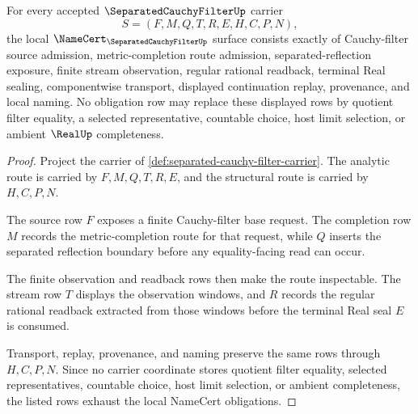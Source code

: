 \begin{theorem}
\label{thm:separated-cauchy-filter-namecert-obligations}
For every accepted $\SeparatedCauchyFilterUp$ carrier
$$
S=(F,M,Q,T,R,E,H,C,P,N),
$$
the local $\NameCert_{\SeparatedCauchyFilterUp}$ surface consists exactly of Cauchy-filter source admission, metric-completion route admission, separated-reflection exposure, finite stream observation, regular rational readback, terminal Real sealing, componentwise transport, displayed continuation replay, provenance, and local naming. No obligation row may replace these displayed rows by quotient filter equality, a selected representative, countable choice, host limit selection, or ambient $\RealUp$ completeness.
\end{theorem}
\begin{proof}
Project the carrier of \autoref{def:separated-cauchy-filter-carrier}. The analytic route is carried by $F,M,Q,T,R,E$, and the structural route is carried by $H,C,P,N$.

The source row $F$ exposes a finite Cauchy-filter base request. The completion row $M$ records the metric-completion route for that request, while $Q$ inserts the separated reflection boundary before any equality-facing read can occur.

The finite observation and readback rows then make the route inspectable. The stream row $T$ displays the observation windows, and $R$ records the regular rational readback extracted from those windows before the terminal Real seal $E$ is consumed.

Transport, replay, provenance, and naming preserve the same rows through $H,C,P,N$. Since no carrier coordinate stores quotient filter equality, selected representatives, countable choice, host limit selection, or ambient completeness, the listed rows exhaust the local NameCert obligations.
\end{proof}

